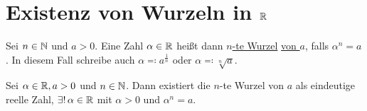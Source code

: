 \documentclass[../ana1.tex]{subfiles}
\begin{document}
\setcounter{section}{5}

\section{Existenz von Wurzeln in \(\mathbb{R} \)}

\begin{notation}
	Sei \( n \in\mathbb{N} \) und \(a > 0 \). Eine Zahl \(\alpha \in \mathbb{R} \) heißt dann \underline{\(n\)-te Wurzel} \underline{von \(a \)}, falls \(\alpha^n = a \).
	In diesem Fall schreibe auch \( \alpha \eqqcolon a^{\frac{1}{n}}\) oder \(\alpha \eqqcolon \sqrt[n]{a} \).
\end{notation}

\begin{satz}\label{satz:ex_wurzel}
	Sei \(\alpha \in\mathbb{R}, a>0\) und \(n \in \mathbb{N} \). Dann existiert die \(n\)-te Wurzel von \(a\) als eindeutige reelle Zahl,
	\dphp  \(\exists! \, \alpha \in \mathbb{R} \) mit \(\alpha > 0 \) und \(\alpha^n = a \).
\end{satz}
\end{document}
